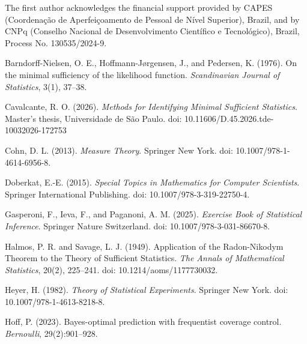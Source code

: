 \documentclass[12pt]{article}
\begin{document}
The first author acknowledges the financial support provided by CAPES (Coordenação de Aperfeiçoamento de Pessoal de Nível Superior), Brazil, and by CNPq (Conselho Nacional de Desenvolvimento Científico e Tecnológico), Brazil, Process No. 130535/2024-9.


















\begin{thebibliography}{}

Barndorff-Nielsen, O. E., Hoffmann-J{\o}rgensen, J., and Pedersen, K. (1976).
\newblock On the minimal sufficiency of the likelihood function.
\newblock \emph{Scandinavian Journal of Statistics}, 3(1), 37--38.

Cavalcante, R. O. (2026).
\newblock \emph{Methods for Identifying Minimal Sufficient Statistics}.
\newblock Master's thesis, Universidade de São Paulo. 
\newblock doi: 10.11606/D.45.2026.tde-10032026-172753

Cohn, D. L. (2013).
\newblock \emph{Measure Theory}.
\newblock Springer New York. doi: 10.1007/978-1-4614-6956-8.

Doberkat, E.-E. (2015).
\newblock \emph{Special Topics in Mathematics for Computer Scientists}.
\newblock Springer International Publishing. doi: 10.1007/978-3-319-22750-4.

Gasperoni, F., Ieva, F., and Paganoni, A. M. (2025).
\newblock \emph{Exercise Book of Statistical Inference}.
\newblock Springer Nature Switzerland. doi: 10.1007/978-3-031-86670-8.

Halmos, P. R. and Savage, L. J. (1949).
\newblock Application of the Radon-Nikodym Theorem to the Theory of Sufficient Statistics.
\newblock \emph{The Annals of Mathematical Statistics}, 20(2), 225--241. doi: 10.1214/aoms/1177730032.

Heyer, H. (1982).
\newblock \emph{Theory of Statistical Experiments}.
\newblock Springer New York. doi: 10.1007/978-1-4613-8218-8.

Hoff, P. (2023). 
\newblock Bayes-optimal prediction with frequentist coverage control. 
\newblock \emph{Bernoulli},  29(2):901--928.



\end{thebibliography}
\end{document}

